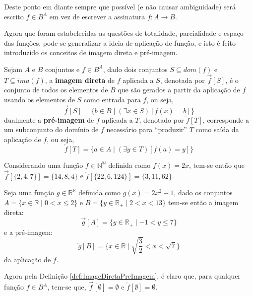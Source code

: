 \begin{atencao}
  Deste ponto em diante sempre que possível (e não causar ambiguidade) será escrito $f \in B^A$ em vez de escrever a assinatura $f: A \rightarrow B$.
\end{atencao}

Agora que foram estabelecidas as questões de totalidade, parcialidade e espaço das funções, pode-se generalizar a ideia de aplicação de função, e isto é feito introduzido os conceitos de imagem direta e pré-imagem.

\begin{definicao}\label{def:ImageDiretaPreImagem}
  Sejam $A$ e $B$ conjuntos e $f \in B^A$, dado dois conjuntos $S \subseteq dom(f)$ e $T \subseteq ima(f)$, a \textbf{imagem direta} de $f$ aplicada a $S$, denotada por $\overrightarrow{f}[S]$, é o conjunto de todos os elementos de $B$ que são gerados a partir da aplicação de $f$ usando os elementos de $S$ como entrada para $f$, ou seja,
	$$\overrightarrow{f}[S] = \{b \in B \mid (\exists x \in S)[f(x) = b]\}$$
	dualmente a \textbf{pré-imagem} de $f$ aplicada a $T$, denotado por $\overleftarrow{f}[T]$, corresponde a um subconjunto do domínio de $f$ necessário para ``produzir'' $T$ como saída da aplicação de $f$, ou seja, 
	$$\overleftarrow{f}[T] = \{a \in A \mid (\exists y \in T)[f(a) = y]\}$$
\end{definicao}

\begin{exemplo}\label{exe:ImagemDiretaPreImagem1}
	Considerando uma função $f \in \mathbb{N}^\mathbb{N}$ definida como $f(x)= 2x$, tem-se então que $\overrightarrow{f}[\{2, 4, 7\}] = \{14, 8, 4\}$ e $\overleftarrow{f}[\{22, 6, 124\}] = \{3, 11, 62\}$.
\end{exemplo}

\begin{exemplo}\label{exe:ImagemDiretaPreImagem2}
  Seja uma função $g \in \mathbb{R}^\mathbb{R}$ definida como $g(x)= 2x^2 - 1$, dado os conjuntos $A = \{ x\in \mathbb{R} \mid 0 < x \leq 2\}$ e $B = \{y \in \mathbb{R}_+ \mid 2 < x < 13\}$ tem-se então a imagem direta: 
  $$\overrightarrow{g}[A] = \{y \in \mathbb{R}_+ \mid -1 < y \leq 7 \}$$ 
  e a pré-imagem: 
  $$\overleftarrow{g}[B] = \displaystyle\Big\{x \in \mathbb{R} \mid \sqrt{\frac{3}{2}} < x < \sqrt{7}\Big\}$$
  da aplicação de $f$.
\end{exemplo}

\begin{atencao}
  Agora pela Definição \ref{def:ImageDiretaPreImagem}, é claro que, para qualquer função $f \in B^A$, tem-se que, $\overrightarrow{f}[\emptyset] = \emptyset$ e  $\overleftarrow{f}[\emptyset] = \emptyset$.
\end{atencao}


